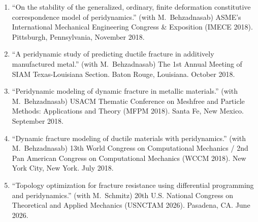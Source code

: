 \begin{enumerate}
  \item ``On the stability of the generalized, ordinary, finite deformation constitutive correspondence model of peridynamics.'' (with M.\ Behzadnasab) ASME's International Mechanical Engineering Congress \& Exposition (IMECE 2018). Pittsburgh, Pennsylvania, November 2018.
  \item ``A peridynamic study of predicting ductile fracture in additively manufactured metal.'' (with M.\ Behzadnasab) The 1st Annual Meeting of SIAM Texas-Louisiana Section. Baton Rouge, Louisiana. October 2018. 
  \item ``Peridynamic modeling of dynamic fracture in metallic materials.'' (with M.\ Behzadnasab) USACM Thematic Conference on Meshfree and Particle Methods: Applications and Theory (MFPM 2018). Santa Fe, New Mexico. September 2018.
  \item ``Dynamic fracture modeling of ductile materials with peridynamics.'' (with M.\ Behzadnasab) 13th World Congress on Computational Mechanics / 2nd Pan American Congress on Computational Mechanics (WCCM 2018). New York City, New York. July 2018.
  \item ``Topology optimization for fracture resistance using differential programming and peridynamics.'' (with M.\ Schmitz) 20th U.S. National Congress on Theoretical and Applied Mechanics (USNCTAM 2026). Pasadena, CA. June 2026.
\end{enumerate}
\else
\ifdefined\ispdf
